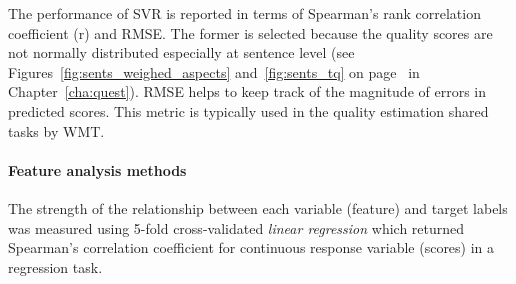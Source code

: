 The performance of \gls{SVR} is reported in terms of Spearman's rank correlation coefficient (r) and \gls{RMSE}. The former is selected because the quality scores are not normally distributed especially at sentence level (see Figures~\ref{fig:sents_weighed_aspects} and~\ref{fig:sents_tq} on page~\pageref{pg:skews} in Chapter~\ref{cha:quest}). \gls{RMSE} helps to keep track of the magnitude of errors in predicted scores. This metric is typically used in the quality estimation shared tasks by \gls{WMT}.

\paragraph{Feature analysis methods}
The strength of the relationship between each variable (feature) and target labels was measured using 5-fold cross-validated \textit{linear regression} which returned Spearman's correlation coefficient for continuous response variable (scores) in a regression task. 







